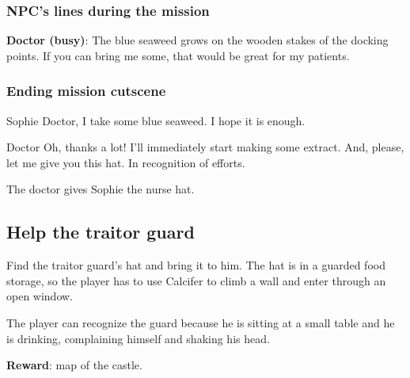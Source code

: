\subsubsection*{NPC's lines during the mission}
\textbf{Doctor (busy)}: The blue seaweed grows on the wooden stakes of the docking points. If you can bring me some, that would be great for my patients.

\subsubsection*{Ending mission cutscene}
\begin{screenplay}

\begin{dialogue}{Sophie}
Doctor, I take some blue seaweed. I hope it is enough.
\end{dialogue}

\begin{dialogue}{Doctor}
Oh, thanks a lot! I'll immediately start making some extract. And, please, let me give you this hat. In recognition of efforts.
\end{dialogue}

The doctor gives Sophie the nurse hat.

\end{screenplay}


\subsection{Help the traitor guard}
Find the traitor guard's hat and bring it to him. The hat is in a guarded food storage, so the player has to use Calcifer to climb a wall and enter through an open window.

The player can recognize the guard because he is sitting at a small table and he is drinking, complaining himself and shaking his head.

\textbf{Reward}: map of the castle.


